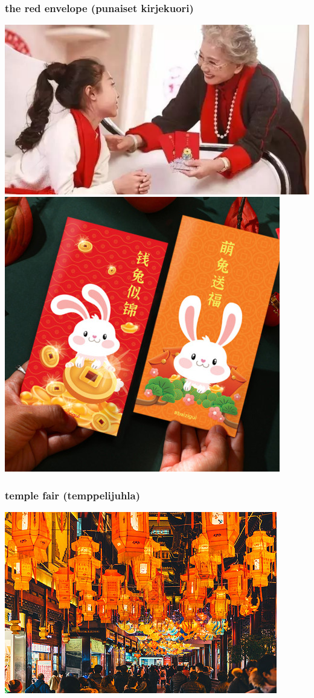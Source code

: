 \documentclass[17pt]{beamer}
\begin{document}
\begin{frame}
  \frametitle{the red envelope (punaiset kirjekuori)}
  \begin{center}
    \includegraphics[height=.35\textheight]{./images/hongbao}\quad
    \includegraphics[height=.35\textheight]{./images/hongbao1}
  \end{center}  
\end{frame}

\begin{frame}
  \frametitle{temple fair (temppelijuhla)}
  \begin{center}
    \includegraphics[height=.75\textheight]{./images/miaohui}
  \end{center}    
\end{frame}
\end{document}

